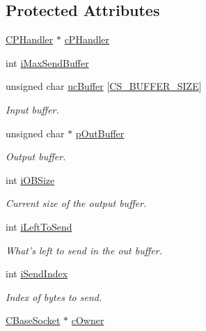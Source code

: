 \subsection*{\-Protected \-Attributes}
\begin{DoxyCompactItemize}
\item 
\hyperlink{class_c_p_handler}{\-C\-P\-Handler} $\ast$ \hyperlink{class_c_p_connection_a9e5914bdbd8aeabe9609d7aa8f03babe}{c\-P\-Handler}
\item 
int \hyperlink{class_c_p_connection_a5851cde8b69706593ef33933702e170a}{i\-Max\-Send\-Buffer}
\item 
unsigned char \hyperlink{class_c_p_connection_aa85421d2cbee8274c6794babc609dce6}{uc\-Buffer} \mbox{[}\hyperlink{class_c_p_connection_a806d0ccf9284ab6cfa8f9f638df5b8e5a212b310ed9516ad4edce81eb3f615a90}{\-C\-S\-\_\-\-B\-U\-F\-F\-E\-R\-\_\-\-S\-I\-Z\-E}\mbox{]}
\begin{DoxyCompactList}\small\item\em \-Input buffer. \end{DoxyCompactList}\item 
unsigned char $\ast$ \hyperlink{class_c_p_connection_a75a016a1c397b5646591eead6aabdfc5}{p\-Out\-Buffer}
\begin{DoxyCompactList}\small\item\em \-Output buffer. \end{DoxyCompactList}\item 
int \hyperlink{class_c_p_connection_a097c729d2ace3e54ad5c87264aac40e2}{i\-O\-B\-Size}
\begin{DoxyCompactList}\small\item\em \-Current size of the output buffer. \end{DoxyCompactList}\item 
int \hyperlink{class_c_p_connection_ac86d2db09fd1dc387c397b75ef491f6e}{i\-Left\-To\-Send}
\begin{DoxyCompactList}\small\item\em \-What's left to send in the out buffer. \end{DoxyCompactList}\item 
int \hyperlink{class_c_p_connection_aaac2a186e16efdb9f7786cc46dd81125}{i\-Send\-Index}
\begin{DoxyCompactList}\small\item\em \-Index of bytes to send. \end{DoxyCompactList}\item 
\hyperlink{class_c_base_socket}{\-C\-Base\-Socket} $\ast$ \hyperlink{class_c_p_connection_a504332c07c9fb47362b5c490182833e9}{c\-Owner}

\end{DoxyCompactItemize}
